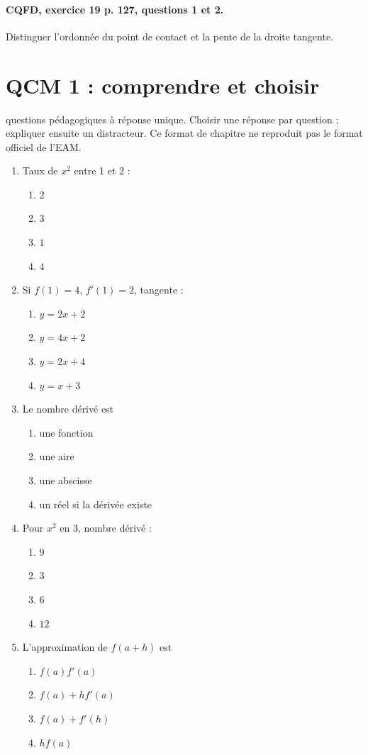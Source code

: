 \paragraph{CQFD, exercice 19 p. 127, questions 1 et 2.}\label{C04-M2} Distinguer l’ordonnée du point de contact et la pente de la droite tangente.
\begingroup\small
\mxnewpage\section*{QCM 1 : comprendre et choisir}\label{C04-Q1}
 questions pédagogiques à réponse unique. Choisir une réponse par question ; expliquer ensuite un distracteur. Ce format de chapitre ne reproduit pas le format officiel de l’EAM.
\begin{enumerate}
\item Taux de $x^2$ entre 1 et 2 :
\begin{enumerate}[label=\Alph*.,itemsep=2pt]
\item $2$
\item $3$
\item $1$
\item $4$
\end{enumerate}
\item Si $f(1)=4$, $f\prime(1)=2$, tangente :
\begin{enumerate}[label=\Alph*.,itemsep=2pt]
\item $y=2x+2$
\item $y=4x+2$
\item $y=2x+4$
\item $y=x+3$
\end{enumerate}
\item Le nombre dérivé est
\begin{enumerate}[label=\Alph*.,itemsep=2pt]
\item une fonction
\item une aire
\item une abscisse
\item un réel si la dérivée existe
\end{enumerate}
\item Pour $x^2$ en 3, nombre dérivé :
\begin{enumerate}[label=\Alph*.,itemsep=2pt]
\item $9$
\item $3$
\item $6$
\item $12$
\end{enumerate}
\item L’approximation de $f(a+h)$ est
\begin{enumerate}[label=\Alph*.,itemsep=2pt]
\item $f(a)f\prime(a)$
\item $f(a)+hf\prime(a)$
\item $f(a)+f\prime(h)$
\item $hf(a)$
\end{enumerate}
\end{enumerate}
